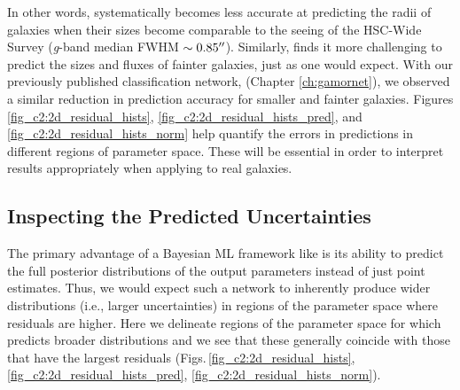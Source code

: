 In other words, \gampen{} systematically becomes less accurate at predicting the radii of galaxies when their sizes become comparable to the seeing of the HSC-Wide Survey (\textit{g}-band median FWHM $\sim0.85\mbox{$^{\prime\prime}$}$). Similarly, \gampen{} finds it more challenging to predict the sizes and fluxes of fainter galaxies, just as one would expect.
With our previously published classification network, \gamornet{} (Chapter \ref{ch:gamornet}), we observed a similar reduction in prediction accuracy for smaller and fainter galaxies. Figures \ref{fig_c2:2d_residual_hists}, \ref{fig_c2:2d_residual_hists_pred}, and \ref{fig_c2:2d_residual_hists_norm} help quantify the errors in \gampen{} predictions in different regions of parameter space. These will be essential in order to interpret results appropriately when applying \gampen{} to real galaxies. 

\vspace{0.8cm}

\subsection{Inspecting the Predicted Uncertainties} \label{subsec_c2:uncertainties}
The primary advantage of a Bayesian ML framework like \gampen{} is its ability to predict the full posterior distributions of the output parameters instead of just point estimates. Thus, we would expect such a network to inherently produce wider distributions (i.e., larger uncertainties) in regions of the parameter space where residuals are higher. Here we delineate regions of the parameter space for which \gampen{} predicts broader distributions and we see that these generally coincide with those that have the largest residuals (Figs.\,\ref{fig_c2:2d_residual_hists}, \ref{fig_c2:2d_residual_hists_pred}, \ref{fig_c2:2d_residual_hists_norm}).  

